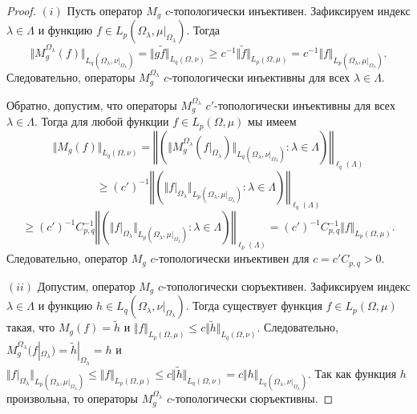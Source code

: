 \begin{proof}
$(i)$ Пусть оператор $M_g$ $c$-топологически инъективен. Зафиксируем индекс
$\lambda\in\Lambda$ и функцию $f\in L_p(\Omega_\lambda,\mu|_{\Omega_\lambda})$.
Тогда 
$$
\Vert M_g^{\Omega_\lambda}(f)\Vert_{L_q(\Omega_\lambda,\nu|_{\Omega_\lambda})}
=\Vert g \widetilde{f}\Vert_{L_q(\Omega,\nu)}
\geq c^{-1}\Vert\widetilde{f}\Vert_{L_p(\Omega,\mu)}
=c^{-1}\Vert f\Vert_{L_p(\Omega_\lambda,\mu|_{\Omega_\lambda})}.
$$
Следовательно, операторы $M_g^{\Omega_\lambda}$ $c$-топологически инъективны для
всех $\lambda\in\Lambda$. 

Обратно, допустим, что операторы $M_g^{\Omega_\lambda}$ $c'$-топологически
инъективны для всех $\lambda\in\Lambda$. Тогда для любой функции $f\in
L_p(\Omega,\mu)$ мы имеем
$$
\Vert M_g(f)\Vert_{L_q(\Omega,\nu)}
=\left\Vert\left(
    \Vert 
        M_g^{\Omega_\lambda}(f|_{\Omega_\lambda})
    \Vert_{L_q(\Omega_\lambda,\nu|_{\Omega_\lambda})}
    :\lambda\in\Lambda
\right)\right\Vert_{\ell_q(\Lambda)}
$$
$$
\geq {(c')}^{-1}\left\Vert\left(
    \Vert 
        f|_{\Omega_\lambda}
    \Vert_{L_p(\Omega_\lambda,\mu|_{\Omega_\lambda})}
    :\lambda\in\Lambda
\right)\right\Vert_{\ell_q(\Lambda)}
$$
$$
\geq {(c')}^{-1} C_{p,q}^{-1}\left\Vert\left(
    \Vert 
        f|_{\Omega_\lambda}
    \Vert_{L_p(\Omega_\lambda,\mu|_{\Omega_\lambda})}
    :\lambda\in\Lambda
\right)\right\Vert_{\ell_p(\Lambda)}
={(c')}^{-1}C_{p,q}^{-1}\Vert f\Vert_{L_p(\Omega,\mu)}.
$$
Следовательно, оператор $M_g$ $c$-топологически инъективен для $c=c'C_{p,q}>0$.

$(ii)$ Допустим, оператор $M_g$ $c$-топологически сюръективен. 
Зафиксируем индекс $\lambda\in\Lambda$ 
и функцию $h\in L_q(\Omega_\lambda,\nu|_{\Omega_\lambda})$.
Тогда существует функция $f\in L_p(\Omega,\mu)$ такая, что
$M_g(f)=\widetilde{h}$ и $\Vert f\Vert_{L_p(\Omega,\mu)}\leq c\Vert
\widetilde{h}\Vert_{L_q(\Omega,\nu)}$. Следовательно,
$M_g^{\Omega_\lambda}(f|_{\Omega_\lambda})=\widetilde{h}|_{\Omega_\lambda}=h$ и
$\Vert f|_{\Omega_\lambda}\Vert_{L_p(\Omega_\lambda,\mu|_{\Omega_\lambda})}
\leq\Vert f\Vert_{L_p(\Omega,\mu)}
\leq c\Vert\widetilde{h}\Vert_{L_q(\Omega,\nu)}
=c\Vert h\Vert_{L_q(\Omega_\lambda,\nu|_{\Omega_\lambda})}$. Так как функция $h$
произвольна, то операторы $M_g^{\Omega_\lambda}$ $c$-топологически сюръективны.


\end{proof}
